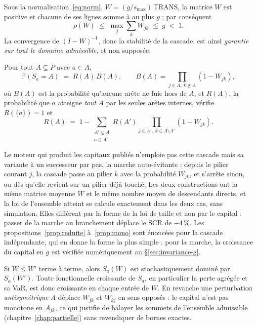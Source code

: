 \begin{proposition}
\label{prop:leontief}
Sous la normalisation~\eqref{eq:norm}, $W=(g/s_{\max})\,\mathrm{TRANS}$, la matrice $W$ est
positive et chacune de ses lignes somme à au plus $g$ ; par conséquent
\[
  \rho(W)\;\le\;\max_j\sum_k W_{jk}\;\le\;g\;<\;1 .
\]
La convergence de $(I-W)^{-1}$, donc la stabilité de la cascade, est ainsi \emph{garantie sur
tout le domaine admissible}, et non supposée.
\end{proposition}

\begin{proposition}
\label{prop:loi}
Pour tout $A\subseteq P$ avec $a\in A$,
\[
  \mathbb P(S_a=A)\;=\;R(A)\,B(A),\qquad
  B(A)=\!\!\prod_{j\in A,\;k\notin A}\!\!(1-W_{jk}),
\]
où $B(A)$ est la probabilité qu'aucune arête ne fuie hors de $A$, et $R(A)$, la probabilité
que $a$ atteigne \emph{tout} $A$ par les seules arêtes internes, vérifie $R(\{a\})=1$ et
\[
  R(A)\;=\;1-\sum_{\substack{A'\subsetneq A\\ a\in A'}} R(A')\!\!\prod_{j\in A',\;k\in A\setminus A'}\!\!(1-W_{jk}).
\]
\end{proposition}

\noindent Le moteur qui produit les capitaux publiés n'emploie pas cette cascade mais sa variante
à un successeur par pas, la marche auto-évitante : depuis le pilier courant $j$, la cascade passe
au pilier $k$ avec la probabilité $W_{jk}$, et s'arrête sinon, ou dès qu'elle revient sur un
pilier déjà touché. Les deux constructions ont la même matrice moyenne $W$ et le même nombre
moyen de descendants directs, et la loi de l'ensemble atteint se calcule exactement dans les deux
cas, sans simulation. Elles diffèrent par la forme de la loi de taille et non par le capital :
passer de la marche au branchement déplace le SCR de $-4\,\%$. Les
propositions~\ref{prop:reduite} à~\ref{prop:mono} sont énoncées pour la cascade indépendante,
qui en donne la forme la plus simple ; pour la marche, la croissance du capital en $g$ est
vérifiée numériquement au \S\ref{sec:invariance-g}.

\begin{proposition}
\label{prop:mono}
Si $W\le W'$ terme à terme, alors $S_a(W)$ est stochastiquement dominé par $S_a(W')$. Toute
fonctionnelle croissante de $S_a$, en particulier la perte agrégée et sa VaR, est donc
croissante en chaque entrée de $W$. En revanche une perturbation \emph{antisymétrique}
$A$ déplace $W_{jk}$ et $W_{kj}$ en sens opposés : le capital n'est pas monotone en $A_{jk}$,
ce qui justifie de balayer les sommets de l'ensemble admissible
(chapitre~\ref{chap:partielle}) sans revendiquer de bornes exactes.
\end{proposition}

